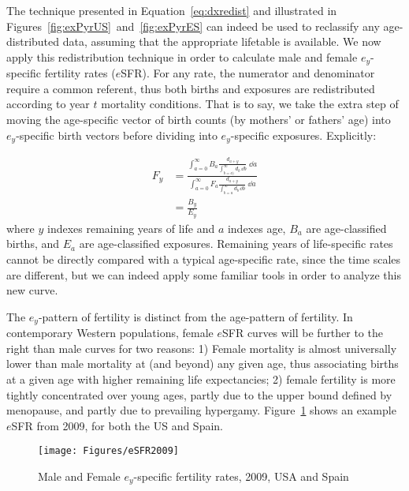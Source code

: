  \FloatBarrier
 \label{sec:exrates}
The technique presented in Equation~\ref{eq:dxredist} and illustrated in
Figures~\ref{fig:exPyrUS}~and~\ref{fig:exPyrES} can indeed be used to reclassify
any age-distributed data, assuming that the appropriate lifetable is available.
We now apply this redistribution technique in order to calculate male and 
female $e_y$-specific fertility rates ($e$SFR). For any rate, the numerator 
and denominator require a common referent, thus both births and exposures are 
redistributed according to year $t$ mortality conditions. That
is to say, we take the extra step of moving the age-specific vector
of birth counts (by mothers' or fathers' age) into $e_y$-specific birth
vectors before dividing into $e_y$-specific exposures. Explicitly:

\begin{align}
\label{eq:eSFR}
F_{y} &= \frac{\int _{a = 0} ^{\infty} B_a \frac{d_{a + y}}{\int _{b = a)}
^{\infty} d_b\, \dd b} \;\dd a}{\int _{a = 0} ^{\infty} F_a \frac{d_{a + y}}{\int _{b = a} ^{\infty} d_b\, \dd b} \;\dd a} \\
 &= \frac{B_{y}}{E_{y}}
\end{align}
where $y$ indexes remaining years of life and $a$ indexes age, $B_a$ are
age-classified births, and $E_a$ are age-classified exposures. Remaining years
of life-specific rates cannot be directly compared with a typical age-specific
rate, since the time scales are different, but we 
can indeed apply some familiar tools in order to analyze this new curve.

The $e_y$-pattern of fertility is distinct from the age-pattern of fertility. 
In contemporary Western populations, female $e$SFR curves will be
further to the right than male curves for two reasons: 1) Female mortality is
almost universally lower than male mortality at (and beyond) any given age,
thus associating births at a given age with higher remaining life expectancies; 2)
female fertility is more tightly concentrated over young ages, partly due to the
upper bound defined by menopause, and partly due to prevailing hypergamy.
Figure~\ref{fig:eSFR2009} shows an example $e$SFR from 2009, for both the US and Spain.

\begin{figure}[ht!]
        \centering  
          \caption{Male and Female $e_y$-specific fertility rates, 2009, USA and
          Spain}
           \texttt{[image: Figures/eSFR2009]}
          \label{fig:eSFR2009}
\end{figure}

